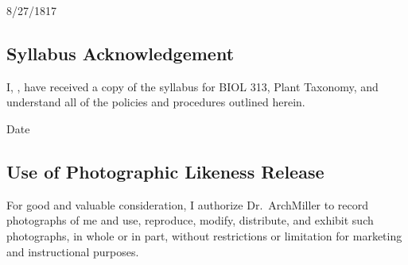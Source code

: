 \documentclass{tufte-handout}
\begin{document}
\begin{fullwidth}
\begin{calendar}{8/27/18}{17}









  \end{calendar}



\end{fullwidth}



\newpage

\subsection{Syllabus Acknowledgement}

I, \underline{\hspace{5cm}}, have received a copy of the syllabus for BIOL 313, Plant Taxonomy, and understand all of the policies and procedures outlined herein. 

  \underline{\hspace{5cm}} {Date}  \hrulefill


\subsection{Use of Photographic Likeness Release}

For good and valuable consideration, I authorize Dr.~ArchMiller to record photographs of me and use, reproduce, modify, distribute, and exhibit such photographs, in whole or in part, without restrictions or limitation for marketing and instructional purposes. 
\end{document}

